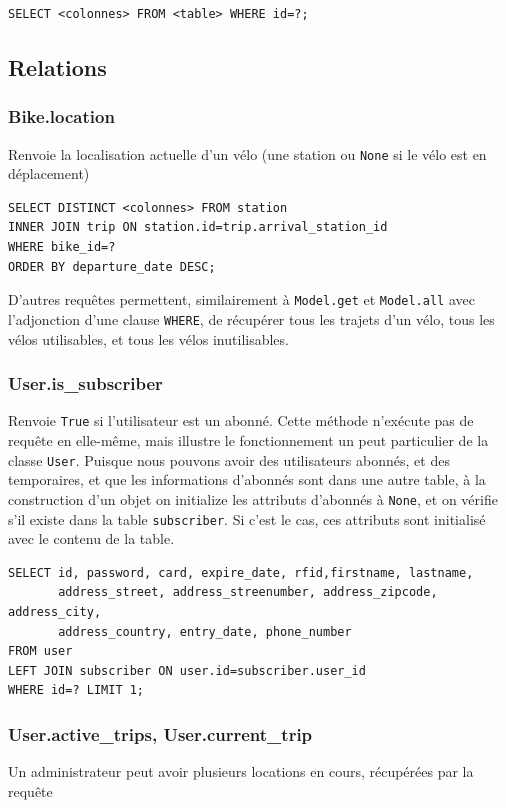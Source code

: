 \documentclass[a4paper,10pt]{article}
\begin{document}
\begin{lstlisting}
SELECT <colonnes> FROM <table> WHERE id=?;
\end{lstlisting}

\subsection{Relations}
\subsubsection{Bike.location}
Renvoie la localisation actuelle d'un vélo (une station ou \texttt{None} si le vélo est en déplacement)
\begin{lstlisting}
SELECT DISTINCT <colonnes> FROM station
INNER JOIN trip ON station.id=trip.arrival_station_id
WHERE bike_id=?
ORDER BY departure_date DESC;
\end{lstlisting}

D'autres requêtes permettent, similairement à \texttt{Model.get} et \texttt{Model.all}
avec l'adjonction d'une clause \lstinline{WHERE}, de récupérer tous les trajets d'un vélo,
tous les vélos utilisables, et tous les vélos inutilisables.

\subsubsection{User.is\_subscriber}
Renvoie \texttt{True} si l'utilisateur est un abonné. Cette méthode n'exécute
pas de requête en elle-même, mais illustre le fonctionnement un peut particulier 
de la classe \texttt{User}. Puisque nous pouvons avoir des utilisateurs abonnés, et
des temporaires, et que les informations d'abonnés sont dans une autre table, à
la construction d'un objet on initialize les attributs d'abonnés à \texttt{None},
et on vérifie s'il existe dans la table \texttt{subscriber}. Si c'est le cas, ces
attributs sont initialisé avec le contenu de la table.

\begin{lstlisting}
SELECT id, password, card, expire_date, rfid,firstname, lastname,
       address_street, address_streenumber, address_zipcode, address_city,
       address_country, entry_date, phone_number
FROM user
LEFT JOIN subscriber ON user.id=subscriber.user_id
WHERE id=? LIMIT 1;
\end{lstlisting}

\subsubsection{User.active\_trips, User.current\_trip}
Un administrateur peut avoir plusieurs locations en cours, récupérées par la requête
\end{document}
